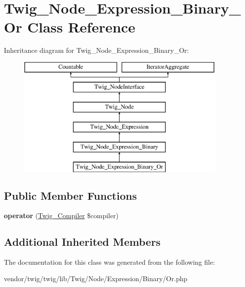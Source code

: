\hypertarget{classTwig__Node__Expression__Binary__Or}{}\section{Twig\+\_\+\+Node\+\_\+\+Expression\+\_\+\+Binary\+\_\+\+Or Class Reference}
\label{classTwig__Node__Expression__Binary__Or}
Inheritance diagram for Twig\+\_\+\+Node\+\_\+\+Expression\+\_\+\+Binary\+\_\+\+Or\+:\begin{figure}[H]
\begin{center}
\leavevmode
\includegraphics[height=6.000000cm]{classTwig__Node__Expression__Binary__Or}
\end{center}
\end{figure}
\subsection*{Public Member Functions}
\begin{DoxyCompactItemize}
\item 
{\bfseries operator} (\hyperlink{classTwig__Compiler}{Twig\+\_\+\+Compiler} \$compiler)\hypertarget{classTwig__Node__Expression__Binary__Or_afb3045a83c9cc2bfae78002e53dc63b6}{}\label{classTwig__Node__Expression__Binary__Or_afb3045a83c9cc2bfae78002e53dc63b6}

\end{DoxyCompactItemize}
\subsection*{Additional Inherited Members}


The documentation for this class was generated from the following file\+:\begin{DoxyCompactItemize}
\item 
vendor/twig/twig/lib/\+Twig/\+Node/\+Expression/\+Binary/Or.\+php\end{DoxyCompactItemize}
